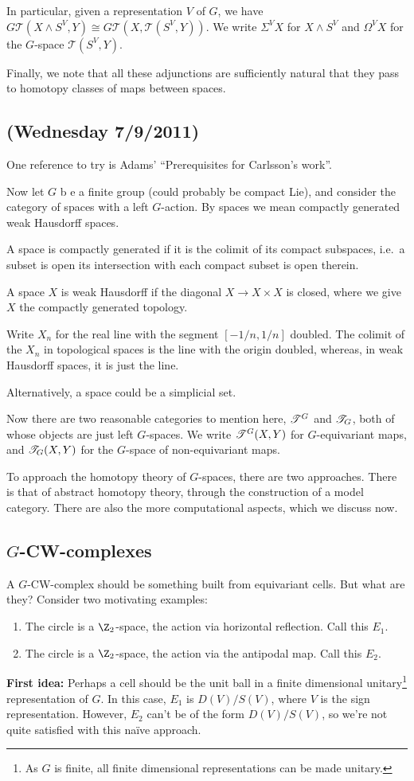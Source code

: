 \documentclass[11pt]{article}
\newcommand{\NewLecture}[3]{\section{#1 {\small(#2/#3/2011)}}}
\begin{document}
\begin{FirstWeek}
In particular, given a representation $V$ of $G$, we have
$G\mathscr{T}(X\wedge S^V, Y)\cong G\mathscr{T}(X,\mathscr{T}(S^V,Y))$. We write $\Sigma^V X$ for $X\wedge S^V$ and $\Omega^V X$ for the $G$-space $\mathscr{T}(S^V,Y)$.

Finally, we note that all these adjunctions are sufficiently natural that they pass to homotopy classes of maps between spaces.
\end{FirstWeek}
\begin{SecondWeek}
\setcounter{section}{2}
\NewLecture{}{Wednesday 7}{9}
One reference to try is Adams' ``Prerequisites for Carlsson's work''.

Now let $G$ b e a finite group (could probably be compact Lie), and consider the category of spaces with a left $G$-action. By spaces we mean compactly generated weak Hausdorff spaces.
\begin{itemise}
\item A space is compactly generated if it is the colimit of its compact subspaces, i.e.\ a subset is open \Iff its intersection with each compact subset is open therein.
\item A space $X$ is weak Hausdorff if the diagonal $X\to X\times X$ is closed, where we give $X$ the compactly generated topology.
\item Write $X_n$ for the real line with the segment $[-1/n,1/n]$ doubled. The colimit of the $X_n$ in topological spaces is the line with the origin doubled, whereas, in weak Hausdorff spaces, it is just the line.
\end{itemise}
Alternatively, a space could be a simplicial set.

Now there are two reasonable categories to mention here, $\mathscr{T}^G$ and $\mathscr{T}_G$, both of whose objects are just left $G$-spaces. We write $\mathscr{T}^G(X,Y)$ for $G$-equivariant maps, and $\mathscr{T}_G(X,Y)$ for the $G$-space of non-equivariant maps.

To approach the homotopy theory of $G$-spaces, there are two approaches. There is that of abstract homotopy theory, through the construction of a model category. There are also the more computational aspects, which we discuss now.
\subsection*{$G$-CW-complexes}
A $G$-CW-complex should be something built from equivariant cells. But what are they? Consider two motivating examples:
\begin{enumerate}\squishlist
\item The circle is a $\Z_2$-space, the action via horizontal reflection. Call this $E_1$.
\item The circle is a $\Z_2$-space, the action via the antipodal map. Call this $E_2$.
\end{enumerate}
\textbf{First idea:} Perhaps a cell should be the unit ball in a finite dimensional unitary\footnote{As $G$ is finite, all finite dimensional representations can be made unitary.} representation of $G$.
In this case, $E_1$ is $D(V)/S(V)$, where $V$ is the sign representation. However, $E_2$ can't be of the form $D(V)/S(V)$, so we're not quite satisfied with this na\"ive approach.


\end{SecondWeek}
\end{document}
